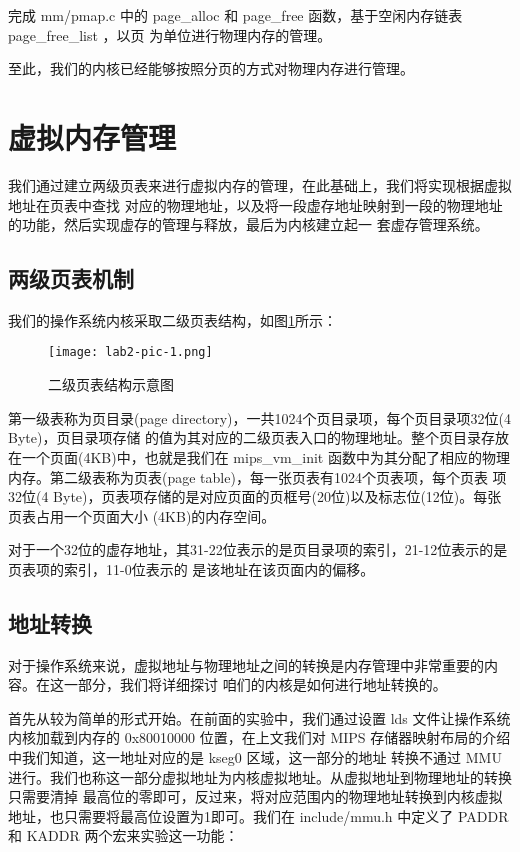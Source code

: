 \begin{exercise}
完成 mm/pmap.c 中的 page\_alloc 和 page\_free 函数，基于空闲内存链表 page\_free\_list ，以页
为单位进行物理内存的管理。
\end{exercise}

至此，我们的内核已经能够按照分页的方式对物理内存进行管理。

\section{虚拟内存管理}

我们通过建立两级页表来进行虚拟内存的管理，在此基础上，我们将实现根据虚拟地址在页表中查找
对应的物理地址，以及将一段虚存地址映射到一段的物理地址的功能，然后实现虚存的管理与释放，最后为内核建立起一
套虚存管理系统。

\subsection{两级页表机制}

我们的操作系统内核采取二级页表结构，如图\ref{lab2-pic-1.png}所示：

\begin{figure}[htbp]
  \centering
  \texttt{[image: lab2-pic-1.png]}
  \caption{二级页表结构示意图}\label{lab2-pic-1.png}
\end{figure}

第一级表称为页目录(page directory)，一共1024个页目录项，每个页目录项32位(4 Byte)，页目录项存储
的值为其对应的二级页表入口的物理地址。整个页目录存放在一个页面(4KB)中，也就是我们在 mips\_vm\_init
函数中为其分配了相应的物理内存。第二级表称为页表(page table)，每一张页表有1024个页表项，每个页表
项32位(4 Byte)，页表项存储的是对应页面的页框号(20位)以及标志位(12位)。每张页表占用一个页面大小
(4KB)的内存空间。

对于一个32位的虚存地址，其31-22位表示的是页目录项的索引，21-12位表示的是页表项的索引，11-0位表示的
是该地址在该页面内的偏移。

\subsection{地址转换}

对于操作系统来说，虚拟地址与物理地址之间的转换是内存管理中非常重要的内容。在这一部分，我们将详细探讨
咱们的内核是如何进行地址转换的。

首先从较为简单的形式开始。在前面的实验中，我们通过设置 lds 文件让操作系统内核加载到内存的 0x80010000
位置，在上文我们对 MIPS 存储器映射布局的介绍中我们知道，这一地址对应的是 kseg0 区域，这一部分的地址
转换不通过 MMU 进行。我们也称这一部分虚拟地址为内核虚拟地址。从虚拟地址到物理地址的转换只需要清掉
最高位的零即可，反过来，将对应范围内的物理地址转换到内核虚拟地址，也只需要将最高位设置为1即可。我们在
 include/mmu.h 中定义了 PADDR 和 KADDR 两个宏来实验这一功能：

